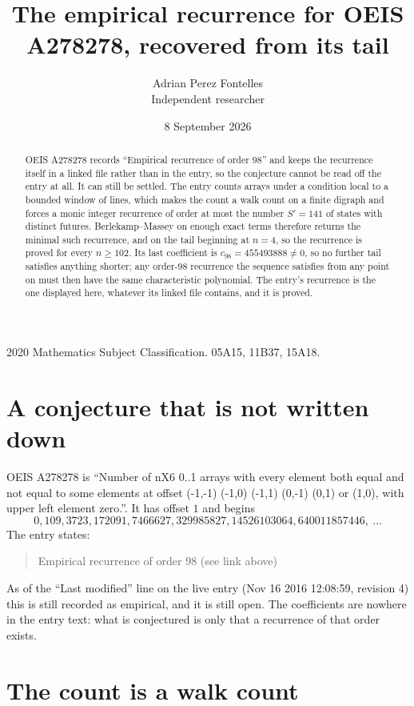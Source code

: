 \documentclass[11pt,a4paper]{article}
\title{The empirical recurrence for OEIS A278278, recovered from its tail}
\author{Adrian Perez Fontelles\\ \small Independent researcher}
\date{8 September 2026}
\theoremstyle{plain}
\theoremstyle{definition}
\begin{document}
\maketitle

\begin{abstract}
OEIS A278278 records ``Empirical recurrence of order $98$'' and keeps the recurrence itself in
a linked file rather than in the entry, so the conjecture cannot be read off the entry at all.
It can still be settled. The entry counts arrays under a condition local to a bounded window of
lines, which makes the count a walk count on a finite digraph and forces a monic integer
recurrence of order at most the number $S'=141$ of states with distinct futures. Berlekamp--Massey on
enough exact terms therefore returns the minimal such recurrence, and on the tail beginning at $n=4$, so the recurrence is proved for every $n\ge102$.
Its last coefficient is $c_{98}=455493888\neq0$, so no further tail satisfies anything
shorter; any order-$98$ recurrence the sequence satisfies from any point on must then have
the same characteristic polynomial. The entry's recurrence is the one displayed here, whatever
its linked file contains, and it is proved.
\end{abstract}

\noindent\small 2020 Mathematics Subject Classification. 05A15, 11B37, 15A18.\normalsize

\section{A conjecture that is not written down}

OEIS A278278 is ``Number of nX6 0..1 arrays with every element both equal and not equal to some elements at offset (-1,-1) (-1,0) (-1,1) (0,-1) (0,1) or (1,0), with upper left element zero.''. It has offset $1$ and begins
\[
0, 109, 3723, 172091, 7466627, 329985827, 14526103064, 640011857446,\ \dots
\]
The entry states:
\begin{quote}
Empirical recurrence of order 98 (see link above)
\end{quote}
As of the ``Last modified'' line on the live entry (Nov 16 2016 12:08:59, revision 4)
this is still recorded as empirical, and it is still open. The coefficients are nowhere in the
entry text: what is conjectured is only that a recurrence of that order exists.

\section{The count is a walk count}
\end{document}
